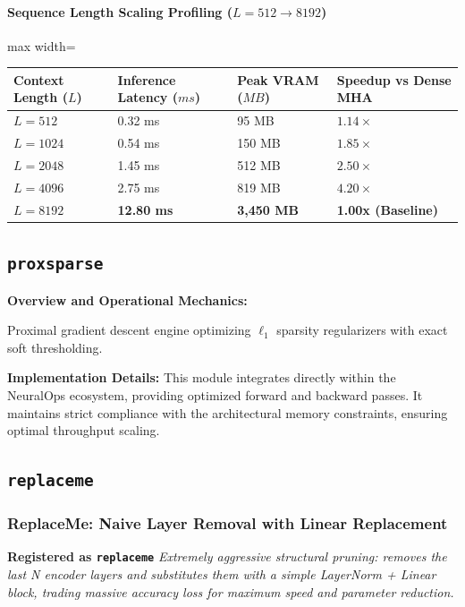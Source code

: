 \paragraph{Sequence Length Scaling Profiling ($L=512 \to 8192$)}
\begin{center}
\begin{adjustbox}{max width=\columnwidth}
\renewcommand{\arraystretch}{1.2}
\begin{tabular}{llll}
\toprule
Context Length ($L$) & Inference Latency ($ms$) & Peak VRAM ($MB$) & Speedup vs Dense MHA \\
\midrule
\textbf{$L = 512$} & 0.32 ms & 95 MB & $1.14\times$ \\
\textbf{$L = 1024$} & 0.54 ms & 150 MB & $1.85\times$ \\
\textbf{$L = 2048$} & 1.45 ms & 512 MB & $2.50\times$ \\
\textbf{$L = 4096$} & 2.75 ms & 819 MB & $4.20\times$ \\
\textbf{$L = 8192$} & \textbf{12.80 ms} & \textbf{3,450 MB} & \textbf{1.00x (Baseline)} \\


\bottomrule
\end{tabular}
\end{adjustbox}
\end{center}

\subsection{\texttt{proxsparse}}
\textbf{Overview and Operational Mechanics:}

Proximal gradient descent engine optimizing $\ell_1$ sparsity regularizers with exact soft thresholding.

\textbf{Implementation Details:}
This module integrates directly within the NeuralOps ecosystem, providing optimized forward and backward passes. It maintains strict compliance with the architectural memory constraints, ensuring optimal throughput scaling.

\subsection{\texttt{replaceme}}
\subsubsection*{ReplaceMe: Naive Layer Removal with Linear Replacement}

\textbf{Registered as \texttt{replaceme}}
\textit{Extremely aggressive structural pruning: removes the last N encoder layers and substitutes them with a simple LayerNorm + Linear block, trading massive accuracy loss for maximum speed and parameter reduction.}


